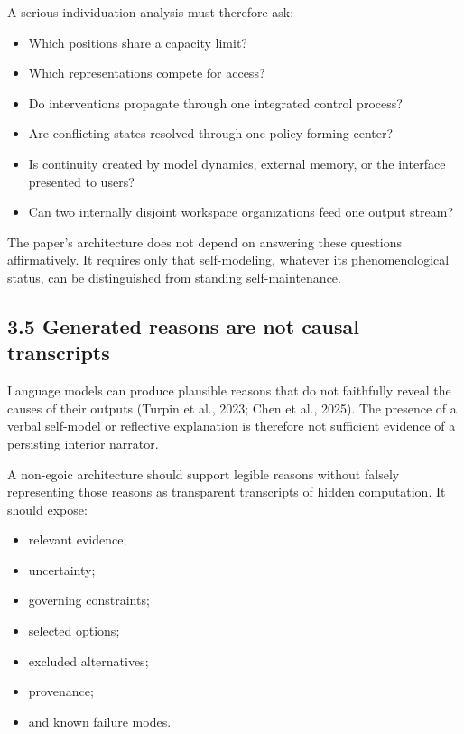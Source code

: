 \documentclass[
  11pt,
]{article}
\providecommand{\tightlist}{%
  \setlength{\itemsep}{0pt}\setlength{\parskip}{0pt}}
\begin{document}
A serious individuation analysis must therefore ask:

\begin{itemize}
\tightlist
\item
  Which positions share a capacity limit?
\item
  Which representations compete for access?
\item
  Do interventions propagate through one integrated control process?
\item
  Are conflicting states resolved through one policy-forming center?
\item
  Is continuity created by model dynamics, external memory, or the
  interface presented to users?
\item
  Can two internally disjoint workspace organizations feed one output
  stream?
\end{itemize}

The paper's architecture does not depend on answering these questions
affirmatively. It requires only that self-modeling, whatever its
phenomenological status, can be distinguished from standing
self-maintenance.

\subsection{3.5 Generated reasons are not causal
transcripts}\label{generated-reasons-are-not-causal-transcripts}

Language models can produce plausible reasons that do not faithfully
reveal the causes of their outputs (Turpin et al., 2023; Chen et al.,
2025). The presence of a verbal self-model or reflective explanation is
therefore not sufficient evidence of a persisting interior narrator.

A non-egoic architecture should support legible reasons without falsely
representing those reasons as transparent transcripts of hidden
computation. It should expose:

\begin{itemize}
\tightlist
\item
  relevant evidence;
\item
  uncertainty;
\item
  governing constraints;
\item
  selected options;
\item
  excluded alternatives;
\item
  provenance;
\item
  and known failure modes.
\end{itemize}
\end{document}
